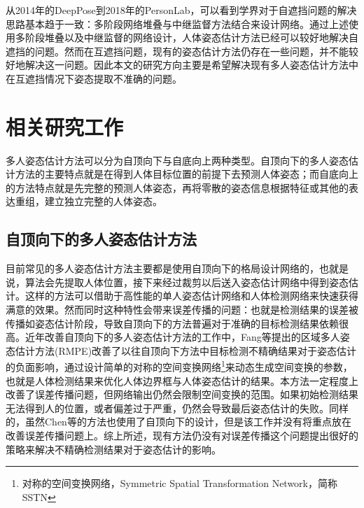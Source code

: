 从2014年的DeepPose\cite{toshev2014deeppose}到2018年的PersonLab\cite{Papandreou2018PersonLab}，可以看到学界对于自遮挡问题的解决思路基本趋于一致：多阶段网络堆叠与中继监督方法结合来设计网络。通过上述使用多阶段堆叠以及中继监督的网络设计，人体姿态估计方法已经可以较好地解决自遮挡的问题。然而在互遮挡问题，现有的姿态估计方法仍存在一些问题，并不能较好地解决这一问题。因此本文的研究方向主要是希望解决现有多人姿态估计方法中在互遮挡情况下姿态提取不准确的问题。

\section{相关研究工作}
\label{sec:related_work}
多人姿态估计方法可以分为自顶向下与自底向上两种类型。自顶向下的多人姿态估计方法的主要特点就是在得到人体目标位置的前提下去预测人体姿态；而自底向上的方法特点就是先完整的预测人体姿态，再将零散的姿态信息根据特征或其他的表达重组，建立独立完整的人体姿态。

\subsection{自顶向下的多人姿态估计方法}
\label{subsec:topdown}
目前常见的多人姿态估计方法主要都是使用自顶向下的格局设计网络的，也就是说，算法会先提取人体位置，接下来经过裁剪以后送入姿态估计网络中得到姿态估计。这样的方法可以借助于高性能的单人姿态估计网络和人体检测网络来快速获得满意的效果。然而同时这种特性会带来误差传播的问题：也就是检测结果的误差被传播如姿态估计阶段，导致自顶向下的方法普遍对于准确的目标检测结果依赖很高。近年改善自顶向下的多人姿态估计方法的工作中，Fang等提出的区域多人姿态估计方法\cite{fang2017rmpe}(RMPE)改善了以往自顶向下方法中目标检测不精确结果对于姿态估计的负面影响，通过设计简单的对称的空间变换网络\footnote{对称的空间变换网络，Symmetric Spatial Transformation Network，简称SSTN}来动态生成空间变换的参数，也就是人体检测结果来优化人体边界框与人体姿态估计的结果。本方法一定程度上改善了误差传播问题，但网络输出仍然会限制空间变换的范围。如果初始检测结果无法得到人的位置，或者偏差过于严重，仍然会导致最后姿态估计的失败。同样的，虽然Chen等的方法\cite{Chen2017Cascaded}也使用了自顶向下的设计，但是该工作并没有将重点放在改善误差传播问题上。综上所述，现有方法仍没有对误差传播这个问题提出很好的策略来解决不精确检测结果对于姿态估计的影响。

